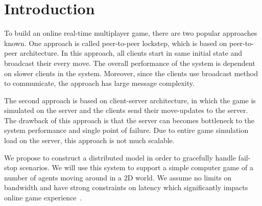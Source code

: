 
\section{Introduction}
\label{sec:Intro}

To build an online real-time  multiplayer game, there are two popular approaches known. One approach is called peer-to-peer lockstep, which is based on peer-to-peer architecture. In this approach, all clients start in same initial state and broadcast their every move. The overall performance of the system is dependent on slower clients in the system. Moreover, since the clients use broadcast method to communicate, the approach has large message complexity.

The second approach is based on client-server architecture, in which the game is simulated on the server and the clients send their move-updates to the server. The drawback of this approach is that the server can becomes bottleneck to the system performance and single point of failure. Due to entire game simulation load on the server, this approach is not much scalable.

We propose to construct a distributed \clientServer model in order to gracefully handle fail-stop scenarios. We will use this system to support a simple computer game of a number of agents moving around in a 2D world. We assume no limits on bandwidth and have strong constraints on latency which significantly impacts online game experience~\cite{Claypool:2006:LPA:1167838.1167860}.

	

